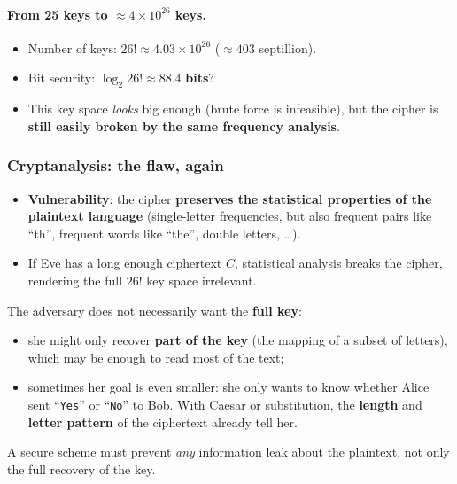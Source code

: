 \paragraph{From 25 keys to $\approx 4 \times 10^{26}$ keys.}
\begin{itemize}
    \item Number of keys: $26! \approx 4.03 \times 10^{26}$ ($\approx 403$ septillion).
    \item Bit security: $\log_2 26! \approx \mathbf{88.4}$ \textbf{bits}?
    \item This key space \emph{looks} big enough (brute force is infeasible), but the cipher is \textbf{still easily broken by the same frequency analysis}.
\end{itemize}

\subsubsection{Cryptanalysis: the flaw, again}

\begin{itemize}
    \item \textbf{Vulnerability}: the cipher \textbf{preserves the statistical properties of the plaintext language} (single-letter frequencies, but also frequent pairs like ``th'', frequent words like ``the'', double letters, \dots).
    \item If Eve has a long enough ciphertext $C$, statistical analysis breaks the cipher, rendering the full $26!$ key space irrelevant.
\end{itemize}

\begin{remark}
The adversary does not necessarily want the \textbf{full key}:
\begin{itemize}
    \item she might only recover \textbf{part of the key} (the mapping of a subset of letters), which may be enough to read most of the text;
    \item sometimes her goal is even smaller: she only wants to know whether Alice sent ``\texttt{Yes}'' or ``\texttt{No}'' to Bob. With Caesar or substitution, the \textbf{length} and \textbf{letter pattern} of the ciphertext already tell her.
\end{itemize}
A secure scheme must prevent \emph{any} information leak about the plaintext, not only the full recovery of the key.
\end{remark}

